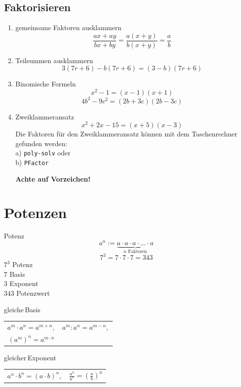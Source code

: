 \begin{multicols}{2}
\subsection*{Faktorisieren}


\begin{rezept*}{}{}
\begin{enumerate}
\item gemeinsame Faktoren ausklammern
$$\frac{ax+ay}{bx+by} =\frac{a(x+y)}{b(x+y)} = \frac{a}b$$
\item Teilsummen ausklammern
$$3(7r+6) - b(7r+6) = (3-b)(7r+6)$$
\item Binomische Formeln
$$x^2-1 = (x-1)(x+1)$$
$$4b^2-9c^2=(2b+3c)(2b-3c)$$
\item Zweiklammeransatz
$$x^2+2x-15 = (x+5)(x-3)$$
Die Faktoren für den Zweiklammeransatz können mit dem Taschenrechner
gefunden werden:\\ a) \texttt{poly-solv} 
oder\\ b) \texttt{PFactor} 

\textbf{\color{red}Achte auf Vorzeichen!}
\end{enumerate}
\end{rezept*}


\section*{Potenzen}
\begin{definition*}{Potenz}{}
$$a^n := \underbrace{a\cdot{}a\cdot{}a\cdot{}...\cdot{}a}_{n\textrm{ Faktoren}}$$
$$7^3=7\cdot{}7\cdot{}7=343$$
$7^3$ Potenz\\
$7$ Basis\\
$3$ Exponent\\
$343$ Potenzwert\\
\end{definition*}

\begin{gesetz*}{gleiche\,Basis}{}
\begin{tabular}{cc}
$a^m\cdot{}a^n = a^{m+n},$ & $a^m:a^n=a^{m-n},$ \\
$\left(a^m\right)^n = a^{m\cdot{}n}$ &\\
 \end{tabular} 
\end{gesetz*}

\begin{gesetz*}{gleicher\,Exponent}{}
\begin{tabular}{cc}
$a^n\cdot{}b^n = (a\cdot{}b)^n,$ & $\frac{a^n}{b^n} =\left(\frac{a}b\right)^n $\\
 \end{tabular}
\end{gesetz*}


\end{multicols}
